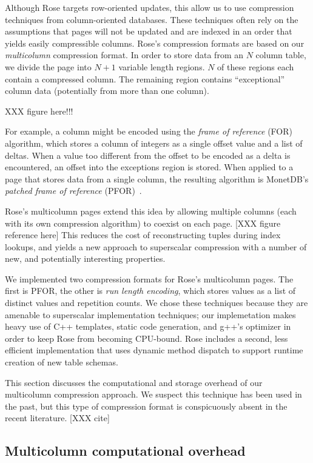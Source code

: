 \documentclass{vldb}
\newcommand{\rows}{Rose\xspace}
\newcommand{\rowss}{Rose's\xspace}
\begin{document}
Although \rows targets row-oriented updates, this allow us to use compression
techniques from column-oriented databases.  These techniques often rely on the
assumptions that pages will not be updated and are indexed in an order that yields easily
compressible columns.  \rowss compression formats are based on our
{\em multicolumn} compression format.  In order to store data from
an $N$ column table, we divide the page into $N+1$ variable length
regions.  $N$ of these regions each contain a compressed column.  The
remaining region contains ``exceptional'' column data (potentially
from more than one column).

XXX figure here!!!

For example, a column might be encoded using the {\em frame of
  reference} (FOR) algorithm, which stores a column of integers as a
single offset value and a list of deltas.  When a value too different
from the offset to be encoded as a delta is encountered, an offset
into the exceptions region is stored.  When applied to a page that
stores data from a single column, the resulting algorithm is MonetDB's
{\em patched frame of reference} (PFOR)~\cite{pfor}.

\rowss multicolumn pages extend this idea by allowing multiple columns
(each with its own compression algorithm) to coexist on each page.
[XXX figure reference here]
This reduces the cost of reconstructing tuples during index lookups,
and yields a new approach to superscalar compression with a number of
new, and potentially interesting properties.

We implemented two compression formats for \rowss multicolumn pages.
The first is PFOR, the other is {\em run length encoding}, which
stores values as a list of distinct values and repetition counts.  We
chose these techniques because they are amenable to superscalar
implementation techniques; our implemetation makes heavy use of C++
templates, static code generation, and g++'s optimizer in order to
keep \rows from becoming CPU-bound.  \rows includes a second, less
efficient implementation that uses dynamic method dispatch to support
runtime creation of new table schemas.

This section discusses the computational and storage overhead of our multicolumn
compression approach.  We suspect this technique has been used in the
past, but this type of compression format is conspicuously absent in
the recent literature. [XXX cite]

\subsection{Multicolumn computational overhead}
\end{document}
